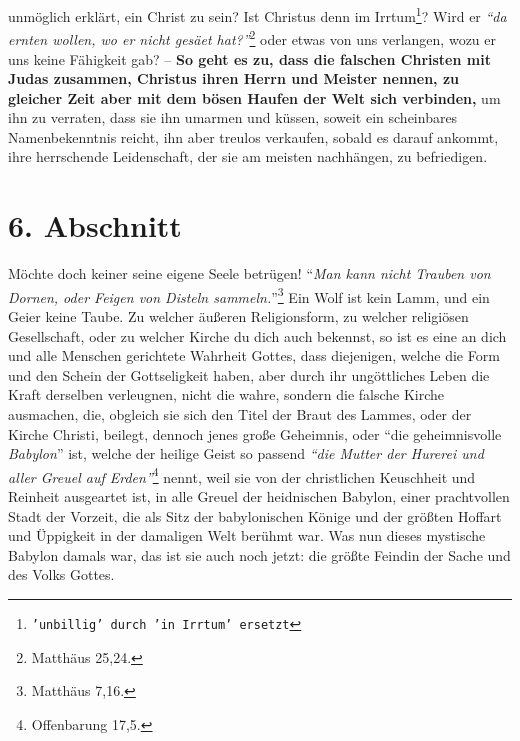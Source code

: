 unmöglich erklärt, ein Christ zu sein? Ist Christus denn im Irrtum\footnote{\texttt{'unbillig' durch 'in Irrtum' ersetzt}}? Wird er
\textit{"`da ernten wollen, wo er nicht gesäet hat?"'}\footnote{Matthäus 25,24.}
oder etwas von uns verlangen, wozu er uns
keine Fähigkeit gab?
 \label{ref:01_05_in_suende_verbinden}
-- \textbf{So geht es zu, dass die falschen Christen mit Judas zusammen, Christus ihren
Herrn und Meister nennen, zu gleicher Zeit aber mit dem bösen Haufen der Welt
sich verbinden,} um ihn zu verraten,
dass sie ihn umarmen und küssen, soweit ein scheinbares Namenbekenntnis
 reicht, ihn aber treulos verkaufen, sobald es darauf
ankommt, ihre herrschende Leidenschaft, der sie am meisten nachhängen, zu
befriedigen.

\section{6. Abschnitt} \label{kap1_ab6}

Möchte doch keiner seine eigene Seele betrügen!
"`\textit{Man kann nicht Trauben von Dornen, oder Feigen von Disteln sammeln.}"'\footnote{Matthäus 7,16.} 
Ein Wolf ist kein Lamm, und ein Geier keine Taube.
Zu welcher äußeren Religionsform, zu welcher religiösen Gesellschaft, oder zu
welcher Kirche du dich auch bekennst, so ist es eine an dich und alle Menschen
gerichtete Wahrheit Gottes, dass diejenigen, welche die Form und den Schein der
Gottseligkeit haben, aber durch ihr ungöttliches Leben die Kraft derselben
verleugnen, nicht die wahre, sondern die falsche Kirche ausmachen, die, obgleich
sie sich den Titel der Braut des Lammes, oder der Kirche Christi, beilegt,
dennoch jenes große Geheimnis, oder "`die geheimnisvolle \textit{Babylon}"'
  ist, welche der heilige
Geist so passend
\textit{"`die Mutter der Hurerei und aller Greuel auf Erden"'}\footnote{Offenbarung 17,5.}
nennt, weil
sie von der christlichen Keuschheit und Reinheit ausgeartet ist, in alle Greuel
der heidnischen Babylon, einer prachtvollen Stadt der Vorzeit, die als Sitz der
babylonischen Könige und der größten Hoffart und Üppigkeit in der damaligen
Welt berühmt war. Was nun dieses mystische Babylon damals war, das ist sie auch
noch jetzt: die größte Feindin der Sache und des Volks Gottes.

